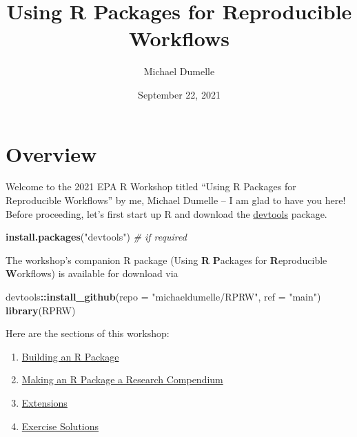 \documentclass[
]{book}
\title{Using R Packages for Reproducible Workflows}
\author{Michael Dumelle}
\date{September 22, 2021}
\newenvironment{Shaded}{\begin{snugshade}}{\end{snugshade}}
\newcommand{\CommentTok}[1]{\textcolor[rgb]{0.56,0.35,0.01}{\textit{#1}}}
\newcommand{\DataTypeTok}[1]{\textcolor[rgb]{0.13,0.29,0.53}{#1}}
\newcommand{\KeywordTok}[1]{\textcolor[rgb]{0.13,0.29,0.53}{\textbf{#1}}}
\newcommand{\NormalTok}[1]{#1}
\newcommand{\OperatorTok}[1]{\textcolor[rgb]{0.81,0.36,0.00}{\textbf{#1}}}
\newcommand{\StringTok}[1]{\textcolor[rgb]{0.31,0.60,0.02}{#1}}
\begin{document}
\maketitle

{
\setcounter{tocdepth}{1}
\tableofcontents
}
\hypertarget{overview}{%
\chapter*{Overview}\label{overview}}

Welcome to the 2021 EPA R Workshop titled ``Using R Packages for Reproducible Workflows'' by me, Michael Dumelle -- I am glad to have you here! Before proceeding, let's first start up R and download the \href{https://devtools.r-lib.org/}{devtools} package.

\begin{Shaded}
\begin{Highlighting}[]
\KeywordTok{install.packages}\NormalTok{(}\StringTok{"devtools"}\NormalTok{) }\CommentTok{# if required}
\end{Highlighting}
\end{Shaded}

The workshop's companion R package (Using \textbf{R} \textbf{P}ackages for \textbf{R}eproducible \textbf{W}orkflows) is available for download via

\begin{Shaded}
\begin{Highlighting}[]
\NormalTok{devtools}\OperatorTok{::}\KeywordTok{install_github}\NormalTok{(}\DataTypeTok{repo =} \StringTok{"michaeldumelle/RPRW"}\NormalTok{, }\DataTypeTok{ref =} \StringTok{"main"}\NormalTok{)}
\KeywordTok{library}\NormalTok{(RPRW)}
\end{Highlighting}
\end{Shaded}

Here are the sections of this workshop:

\begin{enumerate}
\def\labelenumi{\arabic{enumi}.}
\item
  \protect\hyperlink{r-package}{Building an R Package}
\item
  \protect\hyperlink{r-package-research-compendium}{Making an R Package a Research Compendium}
\item
  \protect\hyperlink{extensions}{Extensions}
\item
  \protect\hyperlink{exercise-solutions}{Exercise Solutions}
\end{enumerate}
\end{document}

